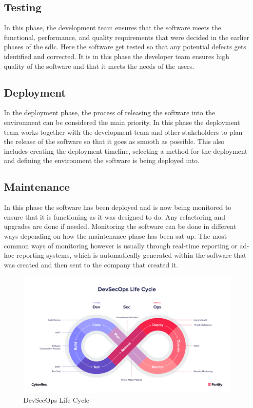  \subsection{Testing}
 In this phase, the development team ensures that the software meets the functional, performance, and quality requirements that were decided in the earlier phases of the \acrshort{sdlc}. Here the software get tested so that any potential defects gets identified and corrected. It is in this phase the developer team ensures high quality of the software and that it meets the needs of the users. \cite{TestingSDLC}
 
\subsection{Deployment}
In the deployment phase, the process of releasing the software into the environment can be considered the main priority. In this phase the deployment team works together with the development team and other stakeholders to plan the release of the software so that it goes as smooth as possible. This also includes creating the deployment timeline, selecting a method for the deployment and defining the environment the software is being deployed into. \cite{DeploymentSDLC}

\subsection{Maintenance} 
In this phase the software has been deployed and is now being monitored to ensure that it is functioning as it was designed to do. Any refactoring and upgrades are done if needed. Monitoring the software can be done in different ways depending on how the maintenance phase has been sat up. The most common ways of monitoring however is usually through real-time reporting or ad-hoc reporting systems, which is automatically generated within the software that was created and then sent to the company that created it.\cite{MaintenanceSDLC} 

\begin{figure}[H]
    \centering
    \includegraphics[width=0.8\columnwidth]{Images/devsec.png}
    \caption{DevSecOps Life Cycle}
    \label{fig: DevSecOps Life Cycle}
\end{figure}


